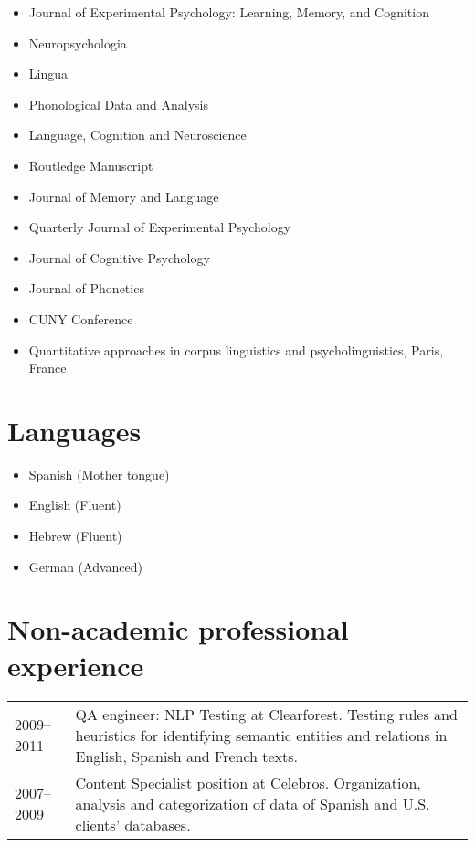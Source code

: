 \documentclass[]{article}
\begin{document}
\begin{itemize}
\item
  Journal of Experimental Psychology: Learning, Memory, and Cognition
\item
  Neuropsychologia
\item
  Lingua
\item
  Phonological Data and Analysis
\item
  Language, Cognition and Neuroscience
\item
  Routledge Manuscript
\item
  Journal of Memory and Language
\item
  Quarterly Journal of Experimental Psychology
\item
  Journal of Cognitive Psychology
\item
  Journal of Phonetics
\item
  CUNY Conference
\item
  Quantitative approaches in corpus linguistics and psycholinguistics,
  Paris, France
\end{itemize}

\hypertarget{languages}{%
\section{Languages}\label{languages}}

\begin{itemize}
\item
  Spanish (Mother tongue)
\item
  English (Fluent)
\item
  Hebrew (Fluent)
\item
  German (Advanced)
\end{itemize}

\hypertarget{non-academic-professional-experience}{%
\section{Non-academic professional
experience}\label{non-academic-professional-experience}}

\begin{longtable}[]{@{}ll@{}}
\toprule
\endhead
\begin{minipage}[t]{0.25\columnwidth}\raggedright
2009--2011\strut
\end{minipage} & \begin{minipage}[t]{0.69\columnwidth}\raggedright
QA engineer: NLP Testing at Clearforest. Testing rules and heuristics
for identifying semantic entities and relations in English, Spanish and
French texts.\strut
\end{minipage}\tabularnewline
\begin{minipage}[t]{0.25\columnwidth}\raggedright
2007--2009\strut
\end{minipage} & \begin{minipage}[t]{0.69\columnwidth}\raggedright
Content Specialist position at Celebros. Organization, analysis and
categorization of data of Spanish and U.S. clients' databases.\strut
\end{minipage}\tabularnewline
\bottomrule
\end{longtable}
\end{document}
